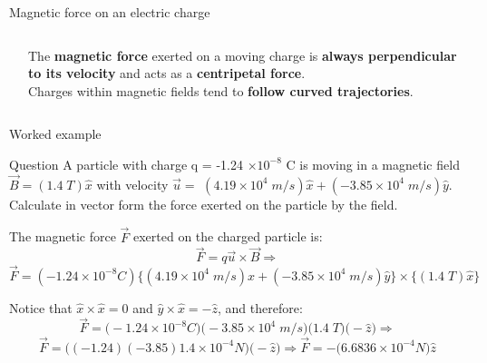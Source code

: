 \begin{frame}{Magnetic force on an electric charge}
\begin{columns}
\begin{column}{0.30\textwidth}
\begin{center}
    \end{center}
  \end{column}
  \begin{column}{0.40\textwidth}
     The {\bf magnetic force} exerted on a moving charge is
     {\bf  always perpendicular to its velocity} and acts as a {\bf centripetal force}.\\
     \vspace{0.1cm}
     Charges within magnetic fields tend to {\bf follow curved trajectories}.
  \end{column}
\end{columns}

\end{frame}


%
%

{
\problemslide

%
%
%

\begin{frame}{Worked example}

\begin{blockexmplque}{Question}
A particle with charge q = -1.24 $\times 10^{-8}$ C is moving
in a magnetic field $\vec{B} = (1.4 \; T) \hat{x}$
with velocity $\vec{u} =$ $(4.19 \times 10^{4} \; m/s) \hat{x} + (-3.85 \times 10^{4} \; m/s) \hat{y}$.
Calculate in vector form the force exerted on the particle by the field.
\end{blockexmplque}
\vspace{0.4cm}

The magnetic force $\vec{F}$ exerted on the charged particle is:
\begin{equation*}
   \vec{F} = q \vec{u} \times \vec{B} \Rightarrow
\end{equation*}
\begin{equation*}
   \vec{F} = (-1.24 \times 10^{-8} C )
                  \Big\{ (4.19 \times 10^{4} \; m/s) \hat{x} + (-3.85 \times 10^{4} \; m/s) \hat{y} \Big\}
                  \times \Big\{(1.4 \; T) \hat{x} \Big\}
\end{equation*}

Notice that
$\hat{x} \times \hat{x} = 0$ and $\hat{y} \times \hat{x} = -\hat{z}$, and therefore:
\begin{equation*}
   \vec{F} = \Big(-1.24 \times 10^{-8} C \Big)
                  \Big(-3.85 \times 10^{4} \; m/s \Big)
                  \Big(1.4 \; T \Big) \Big(-\hat{z}\Big) \Rightarrow
\end{equation*}
\begin{equation*}
   \vec{F} = \Big( (-1.24)  (-3.85) 1.4 \times 10^{-4} N \Big) \Big(- \hat{z}\Big) \Rightarrow
   \vec{F} = - \Big( 6.6836 \times 10^{-4} N \Big)  \hat{z}
\end{equation*}

\end{frame}

} %

